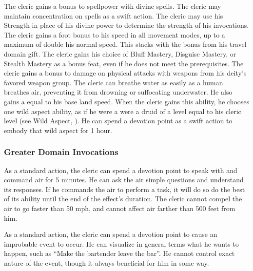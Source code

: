             The cleric gains a  bonus to spellpower with divine spells.
            The cleric may maintain concentration on  spells as a swift action.
            The cleric may use his Strength in place of his divine power to determine the strength of his invocations.
            The cleric gains a  foot bonus to his speed in all movement modes, up to a maximum of double his normal speed.
            This stacks with the bonus from his travel domain gift.
            The cleric gains his choice of Bluff Mastery, Disguise Mastery, or Stealth Mastery as a bonus feat, even if he does not meet the prerequisites.
            The cleric gains a  bonus to damage on physical attacks with weapons from his deity's favored weapon group.
             The cleric can breathe water as easily as a human breathes air, preventing it from drowning or suffocating underwater.
            He also gains a  equal to his base land speed.
            When the cleric gains this ability, he chooses one wild aspect ability, as if he were a were a druid of a level equal to his cleric level (see Wild Aspect, ).
            He can spend a devotion point as a swift action to embody that wild aspect for 1 hour.

        \subsubsection{Greater Domain Invocations}\label{Greater Domain Invocations}

            As a standard action, the cleric can spend a devotion point to speak with and command air for 5 minutes.
            He can ask the air simple questions and understand its responses.
            If he commands the air to perform a task, it will do so do the best of its ability until the end of the effect's duration.
            The cleric cannot compel the air to go faster than 50 mph, and cannot affect air farther than 500 feet from him.

            As a standard action, the cleric can spend a devotion point to cause an improbable event to occur.
            He can visualize in general terms what he wants to happen, such as ``Make the bartender leave the bar''.
            He cannot control exact nature of the event, though it always beneficial for him in some way.

